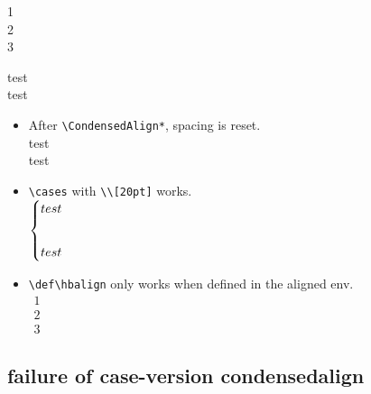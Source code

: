 \documentclass{article}
\begin{document}
\begin{CondensedAlign*}
    1  \\
    2  \\
    3  \\
    \begin{cases*}
        test \\
        test
    \end{cases*}
\end{CondensedAlign*}
\begin{itemize}
    \item After \verb|\CondensedAlign*|, spacing is reset.\\
          test\\
          test\\
    \item \verb|\cases| with \verb|\\[20pt]| works.\\
          $\aligned
              \begin{cases}
                  test \\[20pt]
                  test
              \end{cases}
              \endaligned$\\
    \item \verb|\def\hbalign| only works when defined in the aligned env.
          \let\myhalign\hbalign
          \def\hbalign{%
              \let\mylb\\
              \renewcommand{\\}{\mylb[10cm]}
              \myhalign
          }
          \\
          $\begin{aligned}
                  1 \\
                  2 \\
                  3
              \end{aligned}$
\end{itemize}

\hfuzz=60pt

\subsection{failure of case-version condensedalign}
\end{document}
